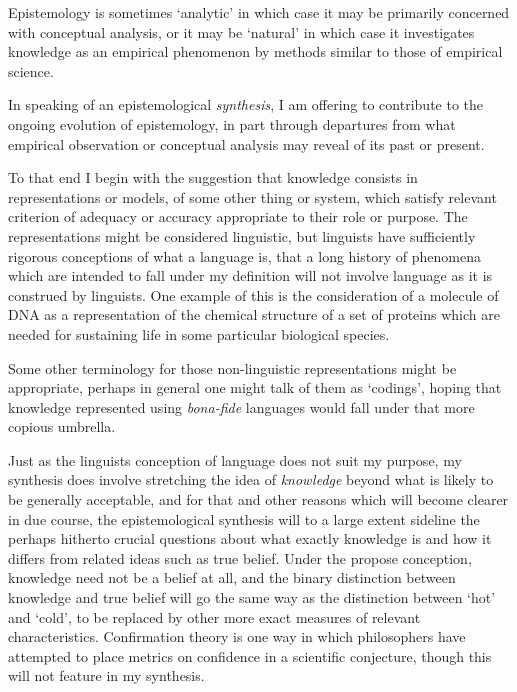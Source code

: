 \documentclass[10pt,titlepage]{book}
\begin{document}
Epistemology is sometimes `analytic' in which case it may be primarily concerned with conceptual analysis, or it may be `natural' in which case it investigates knowledge as an empirical phenomenon by methods similar to those of empirical science.

In speaking of an epistemological \emph{synthesis}, I am offering to contribute to the ongoing evolution of epistemology, in part through departures from what empirical observation or conceptual analysis may reveal of its past or present.

To that end I begin with the suggestion that knowledge consists in representations or models, of some other thing or system, which satisfy relevant criterion of adequacy or accuracy appropriate to their role or purpose.
The representations might be considered linguistic, but linguists have sufficiently rigorous conceptions of what a language is, that a long history of phenomena which are intended to fall under my definition will not involve language as it is construed by linguists.
One example of this is the consideration of a molecule of DNA as a representation of the chemical structure of a set of proteins which are needed for sustaining life in some particular biological species.

Some other terminology for those non-linguistic representations might be appropriate, perhaps in general one might talk of them as `codings', hoping that knowledge represented using \emph{bona-fide} languages would fall under that more copious umbrella.

Just as the linguists conception of language does not suit my purpose, my synthesis does involve stretching the idea of \emph{knowledge} beyond what is likely to be generally acceptable, and for that and other reasons which will become clearer in due course, the epistemological synthesis will to a large extent sideline the perhaps hitherto crucial questions about what exactly knowledge is and how it differs from related ideas such as true belief.
Under the propose conception, knowledge need not be a belief at all, and the binary distinction between knowledge and true belief will go the same way as the distinction between `hot' and `cold', to be replaced by other more exact measures of relevant characteristics.
Confirmation theory is one way in which philosophers have attempted to place metrics on confidence in a scientific conjecture, though this will not feature in my synthesis.
\end{document}
